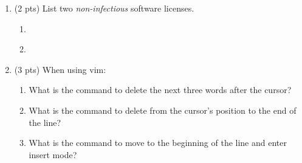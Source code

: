 \documentclass{article}
\begin{document}
\begin{enumerate}
\item
(2 pts)
List two \emph{non-infectious} software licenses.
\begin{enumerate}
\item ~
\vspace{0.5in}
\item ~
\vspace{0.5in}
\end{enumerate}

\item
(3 pts)
When using vim:
\begin{enumerate}
\item
What is the command to delete the next three words after the cursor?
\vspace{0.75in}
\item
What is the command to delete from the cursor's position to the end of the line?
\vspace{0.75in}
\item
What is the command to move to the beginning of the line and enter insert mode?
\vspace{0.75in}
\end{enumerate}

\end{enumerate}
\end{document}
